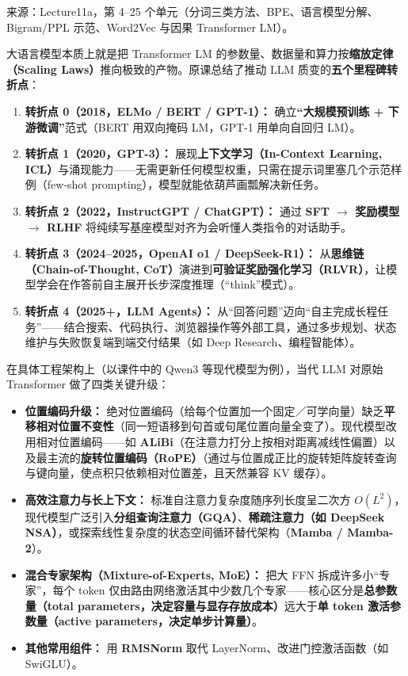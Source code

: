 来源：Lecture11a，第 4–25 个单元（分词三类方法、BPE、语言模型分解、Bigram/PPL 示范、Word2Vec 与因果 Transformer LM）。



大语言模型本质上就是把 Transformer LM 的参数量、数据量和算力按\textbf{缩放定律（Scaling Laws）}推向极致的产物。原课总结了推动 LLM 质变的\textbf{五个里程碑转折点}：
\begin{enumerate}
\item \textbf{转折点 0（2018，ELMo / BERT / GPT-1）：} 确立\textbf{“大规模预训练 + 下游微调”}范式（BERT 用双向掩码 LM，GPT-1 用单向自回归 LM）。
\item \textbf{转折点 1（2020，GPT-3）：} 展现\textbf{上下文学习（In-Context Learning, ICL）}与涌现能力——无需更新任何模型权重，只需在提示词里塞几个示范样例（few-shot prompting），模型就能依葫芦画瓢解决新任务。
\item \textbf{转折点 2（2022，InstructGPT / ChatGPT）：} 通过 \textbf{SFT \ensuremath{\to} 奖励模型 \ensuremath{\to} RLHF} 将纯续写基座模型对齐为会听懂人类指令的对话助手。
\item \textbf{转折点 3（2024–2025，OpenAI o1 / DeepSeek-R1）：} 从\textbf{思维链（Chain-of-Thought, CoT）}演进到\textbf{可验证奖励强化学习（RLVR）}，让模型学会在作答前自主展开长步深度推理（“think”模式）。
\item \textbf{转折点 4（2025+，LLM Agents）：} 从“回答问题”迈向“自主完成长程任务”——结合搜索、代码执行、浏览器操作等外部工具，通过多步规划、状态维护与失败恢复端到端交付结果（如 Deep Research、编程智能体）。
\end{enumerate}

在具体工程架构上（以课件中的 Qwen3 等现代模型为例），当代 LLM 对原始 Transformer 做了四类关键升级：
\begin{itemize}
\item \textbf{位置编码升级：} 绝对位置编码（给每个位置加一个固定／可学向量）缺乏\textbf{平移相对位置不变性}（同一短语移到句首或句尾位置向量全变了）。现代模型改用相对位置编码——如 \textbf{ALiBi}（在注意力打分上按相对距离减线性偏置）以及最主流的\textbf{旋转位置编码（RoPE）}（通过与位置成正比的旋转矩阵旋转查询与键向量，使点积只依赖相对位置差，且天然兼容 KV 缓存）。
\item \textbf{高效注意力与长上下文：} 标准自注意力复杂度随序列长度呈二次方 $O(L^2)$，现代模型广泛引入\textbf{分组查询注意力（GQA）}、\textbf{稀疏注意力（如 DeepSeek NSA）}，或探索线性复杂度的状态空间循环替代架构（\textbf{Mamba / Mamba-2}）。
\item \textbf{混合专家架构（Mixture-of-Experts, MoE）：} 把大 FFN 拆成许多小“专家”，每个 token 仅由路由网络激活其中少数几个专家——核心区分是\textbf{总参数量（total parameters，决定容量与显存存放成本）}远大于\textbf{单 token 激活参数量（active parameters，决定单步计算量）}。
\item \textbf{其他常用组件：} 用 \textbf{RMSNorm} 取代 LayerNorm、改进门控激活函数（如 SwiGLU）。
\end{itemize}

